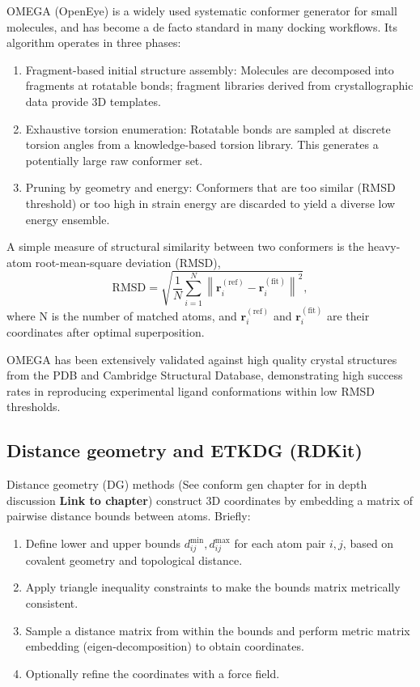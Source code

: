 \documentclass[12pt, a4paper]{article}
\begin{document}
OMEGA (OpenEye) is a widely used systematic conformer generator for small molecules, and has become a de facto standard in many docking workflows.\cite{CH6_Hawkins2010} Its algorithm operates in three phases:
\begin{enumerate}
  \item Fragment-based initial structure assembly: Molecules are decomposed into fragments at rotatable bonds; fragment libraries derived from crystallographic data provide 3D templates.
  \item Exhaustive torsion enumeration: Rotatable bonds are sampled at discrete torsion angles from a knowledge-based torsion library. This generates a potentially large raw conformer set.
  \item Pruning by geometry and energy: Conformers that are too similar (RMSD threshold) or too high in strain energy are discarded to yield a diverse low energy ensemble.
\end{enumerate}

A simple measure of structural similarity between two conformers is the heavy-atom root-mean-square deviation (RMSD),
\[
\mathrm{RMSD} = \sqrt{\frac{1}{N} \sum_{i=1}^{N} \left\lVert \mathbf{r}_i^{(\mathrm{ref})} - \mathbf{r}_i^{(\mathrm{fit})} \right\rVert^2},
\]
where N is the number of matched atoms, and $\mathbf{r}_i^{(\mathrm{ref})}$ and $\mathbf{r}_i^{(\mathrm{fit})}$ are their coordinates after optimal superposition.

OMEGA has been extensively validated against high quality crystal structures from the PDB and Cambridge Structural Database, demonstrating high success rates in reproducing experimental ligand conformations within low RMSD thresholds.\cite{CH6_Hawkins2010}

\subsection{Distance geometry and ETKDG (RDKit)}

Distance geometry (DG) methods (See conform gen chapter for in depth discussion \textbf{Link to chapter}) construct 3D coordinates by embedding a matrix of pairwise distance bounds between atoms.\cite{CH6_Riniker2015} Briefly:
\begin{enumerate}
  \item Define lower and upper bounds $d_{ij}^{\mathrm{min}}, d_{ij}^{\mathrm{max}}$ for each atom pair $i,j$, based on covalent geometry and topological distance.
  \item Apply triangle inequality constraints to make the bounds matrix metrically consistent.
  \item Sample a distance matrix from within the bounds and perform metric matrix embedding (eigen-decomposition) to obtain coordinates.
  \item Optionally refine the coordinates with a force field.
\end{enumerate}
\end{document}

